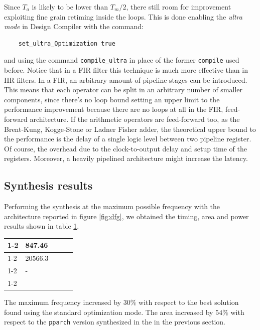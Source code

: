 \documentclass[a4paper]{article}
\begin{document}
Since $T_a$ is likely to be lower than $T_m/2$, there still room for improvement exploiting fine grain retiming inside the loops. This is done enabling the \textit{ultra mode} in Design Compiler with the command:
\begin{verbatim}
	set_ultra_Optimization true
\end{verbatim}
and using the command \texttt{compile\_ultra} in place of the former \texttt{compile} used before. Notice that in a FIR filter this technique is much more effective than in IIR filters. In a FIR, an arbitrary amount of pipeline stages can be introduced. This means that each operator can be split in an arbitrary number of smaller components, since there's no loop bound setting an upper limit to the performance improvement because there are no loops at all in the FIR, feed-forward architecture. If the arithmetic operators are feed-forward too, as the Brent-Kung, Kogge-Stone or Ladner Fisher adder, the theoretical upper bound to the performance is the delay of a single logic level between two pipeline register. Of course, the overhead due to the clock-to-output delay and setup time of the registers. Moreover, a heavily pipelined architecture might increase the latency. 

\subsection{Synthesis results}
Performing the synthesis at the maximum possible frequency with the architecture reported in figure \ref{fig:dfg}, we obtained the timing, area and power results shown in table \ref{tab:ret_res}.

\begin{table}[]
	\centering
	\begin{tabular}{lllll}
	\cline{1-2}
	\multicolumn{1}{|l|}{$f_max$ {[}\si{\mega\hertz}]}}                     & \multicolumn{1}{l|}{847.46}  &  &  &  \\ \cline{1-2}
	\multicolumn{1}{|l|}{Cell area {[}\si{\micro\meter^2}{]}} & \multicolumn{1}{l|}{20566.3} &  &  &  \\ \cline{1-2}
	\multicolumn{1}{|l|}{Power {[}\si{\micro\watt}{]}}                        & \multicolumn{1}{l|}{-}       &  &  &  \\ \cline{1-2}
																					&                              &  &  & 
	\end{tabular}
	\label{tab:ret_res}
\end{table}

The maximum frequency increased by $30\%$ with respect to the best solution found using the standard optimization mode. The area increased by $54\%$ with respect to the \texttt{pparch} version synthesized in the in the previous section. 
\end{document}
